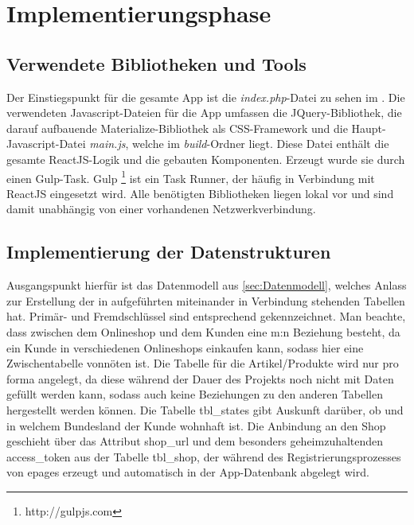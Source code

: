 \section{Implementierungsphase} 
\label{sec:Implementierungsphase}

\subsection{Verwendete Bibliotheken und Tools}
\label{sec:Tools}
Der Einstiegspunkt für die gesamte App ist die \textit{index.php}-Datei zu sehen im . Die verwendeten Javascript-Dateien für die App umfassen die JQuery-Bibliothek, die darauf aufbauende Materialize-Bibliothek als CSS-Framework und die Haupt-Javascript-Datei \textit{main.js}, welche im \textit{build}-Ordner liegt. Diese Datei enthält die gesamte ReactJS-Logik und die gebauten Komponenten. Erzeugt wurde sie durch einen Gulp-Task. Gulp \footnote{http://gulpjs.com} ist ein Task Runner, der häufig in Verbindung mit ReactJS eingesetzt wird. Alle benötigten Bibliotheken liegen lokal vor und sind damit unabhängig von einer vorhandenen Netzwerkverbindung.

\subsection{Implementierung der Datenstrukturen}
\label{sec:ImplementierungDatenstrukturen}

Ausgangspunkt hierfür ist das Datenmodell aus \ref{sec:Datenmodell}, welches Anlass zur Erstellung der in  aufgeführten miteinander in Verbindung stehenden Tabellen hat. Primär- und Fremdschlüssel sind entsprechend gekennzeichnet. Man beachte, dass zwischen dem Onlineshop und dem Kunden eine m:n Beziehung besteht, da ein Kunde in verschiedenen Onlineshops einkaufen kann, sodass hier eine Zwischentabelle vonnöten ist. Die Tabelle für die Artikel/Produkte wird nur pro forma angelegt, da diese während der Dauer des Projekts noch nicht mit Daten gefüllt werden kann, sodass auch keine Beziehungen zu den anderen Tabellen hergestellt werden können. Die Tabelle tbl\_states gibt Auskunft darüber, ob und in welchem Bundesland der Kunde wohnhaft ist. Die Anbindung an den Shop geschieht über das Attribut shop\_url und dem besonders geheimzuhaltenden access\_token aus der Tabelle tbl\_shop, der während des Registrierungsprozesses von epages erzeugt und automatisch in der App-Datenbank abgelegt wird.

